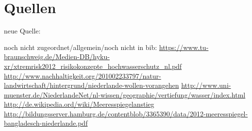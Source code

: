 \part{Quellen}


neue Quelle:

noch nicht zugeordnet/allgemein/noch nicht in bib:
\url{https://www.tu-braunschweig.de/Medien-DB/hyku-xr/xtremrisk2012_risikokonzepte_hochwasserschutz_nl.pdf}
\url{http://www.nachhaltigkeit.org/201002233797/natur-landwirtschaft/hintergrund/niederlande-wollen-vorangehen}
\url{http://www.uni-muenster.de/NiederlandeNet/nl-wissen/geographie/vertiefung/wasser/index.html}
\url{http://de.wikipedia.ord/wiki/Meeresspiegelanstieg}
\url{http://bildungsserver.hamburg.de/contentblob/3365390/data/2012-meeresspiegel-bangladesch-niederlande.pdf}


